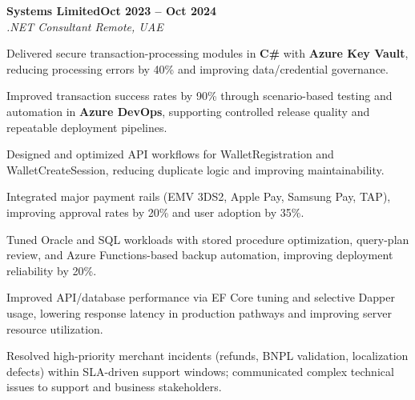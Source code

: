 \documentclass[letterpaper,10pt]{article}
\newcommand{\headingBf}[2]{
  \hspace{10pt}\textbf{#1}\hfill\textbf{#2}\\
}
\newcommand{\headingIt}[2]{
  \hspace{10pt}\textit{#1}\hfill\textit{#2}\\
}
\newenvironment{resume_list}{
  \vspace{-7pt}
  \begin{itemize}[itemsep=-2px, parsep=1pt, leftmargin=30pt]
}{
  \end{itemize}
}
\begin{document}
\headingBf{Systems Limited}{Oct 2023 -- Oct 2024}
\headingIt{.NET Consultant \hfill Remote, UAE}{}
\begin{resume_list}
    \item Delivered secure transaction-processing modules in \textbf{C\#} with \textbf{Azure Key Vault}, reducing processing errors by 40\% and improving data/credential governance.
    \item Improved transaction success rates by 90\% through scenario-based testing and automation in \textbf{Azure DevOps}, supporting controlled release quality and repeatable deployment pipelines.
    \item Designed and optimized API workflows for WalletRegistration and WalletCreateSession, reducing duplicate logic and improving maintainability.
    \item Integrated major payment rails (EMV 3DS2, Apple Pay, Samsung Pay, TAP), improving approval rates by 20\% and user adoption by 35\%.
    \item Tuned Oracle and SQL workloads with stored procedure optimization, query-plan review, and Azure Functions-based backup automation, improving deployment reliability by 20\%.
    \item Improved API/database performance via EF Core tuning and selective Dapper usage, lowering response latency in production pathways and improving server resource utilization.
    \item Resolved high-priority merchant incidents (refunds, BNPL validation, localization defects) within SLA-driven support windows; communicated complex technical issues to support and business stakeholders.
\end{resume_list}
\end{document}
